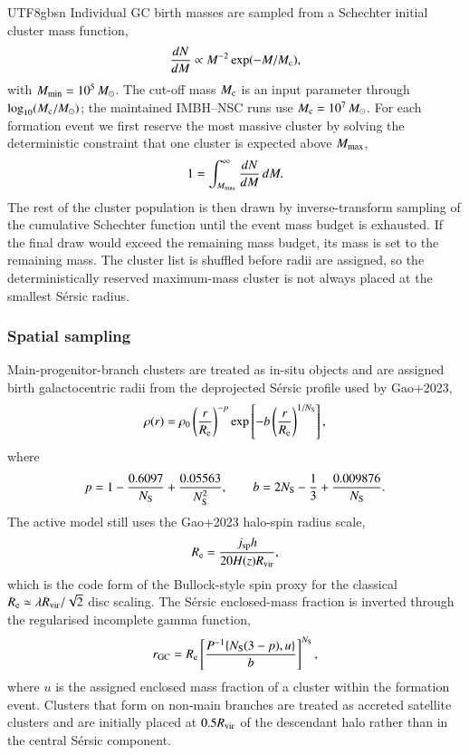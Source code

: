 \documentclass[trackchanges, twocolappendix, twocolumn]{aastex701}
\begin{document}
\begin{CJK*}{UTF8}{gbsn}
Individual GC birth masses are sampled from a Schechter initial cluster mass function,
\begin{equation}
\frac{dN}{dM}\propto M^{-2}\exp(-M/M_{\rm c}),
\label{eq:cimf}
\end{equation}
with \(M_{\rm min}=10^5\,M_{\odot}\). The cut-off mass \(M_{\rm c}\) is an input parameter through \(\log_{10}(M_{\rm c}/M_{\odot})\); the maintained IMBH--NSC runs use \(M_{\rm c}=10^7\,M_{\odot}\). For each formation event we first reserve the most massive cluster by solving the deterministic constraint that one cluster is expected above \(M_{\rm max}\),
\begin{equation}
1=\int_{M_{\rm max}}^{\infty}\frac{dN}{dM}\,dM .
\end{equation}
The rest of the cluster population is then drawn by inverse-transform sampling of the cumulative Schechter function until the event mass budget is exhausted. If the final draw would exceed the remaining mass budget, its mass is set to the remaining mass. The cluster list is shuffled before radii are assigned, so the deterministically reserved maximum-mass cluster is not always placed at the smallest S{\'e}rsic radius.

\subsubsection{Spatial sampling} \label{subsubsect:spatial_sampling}

Main-progenitor-branch clusters are treated as in-situ objects and are assigned birth galactocentric radii from the deprojected S{\'e}rsic profile used by Gao+2023,
\begin{equation}
\rho(r)=\rho_0\left(\frac{r}{R_{\rm e}}\right)^{-p}
\exp\left[-b\left(\frac{r}{R_{\rm e}}\right)^{1/N_{\rm S}}\right],
\label{eq:sersic_density}
\end{equation}
where
\begin{equation}
p=1-\frac{0.6097}{N_{\rm S}}+\frac{0.05563}{N_{\rm S}^2},
\qquad
b=2N_{\rm S}-\frac{1}{3}+\frac{0.009876}{N_{\rm S}}.
\end{equation}
The active model still uses the Gao+2023 halo-spin radius scale,
\begin{equation}
R_{\rm e}=\frac{j_{\rm sp}h}{20H(z)R_{\rm vir}},
\end{equation}
which is the code form of the Bullock-style spin proxy for the classical \(R_{\rm e}\simeq \lambda R_{\rm vir}/\sqrt{2}\) disc scaling. The S{\'e}rsic enclosed-mass fraction is inverted through the regularised incomplete gamma function,
\begin{equation}
r_{\rm GC}=R_{\rm e}
\left[\frac{P^{-1}\{N_{\rm S}(3-p),u\}}{b}\right]^{N_{\rm S}},
\end{equation}
where \(u\) is the assigned enclosed mass fraction of a cluster within the formation event. Clusters that form on non-main branches are treated as accreted satellite clusters and are initially placed at \(0.5R_{\rm vir}\) of the descendant halo rather than in the central S{\'e}rsic component.


\end{CJK*}
\end{document}
